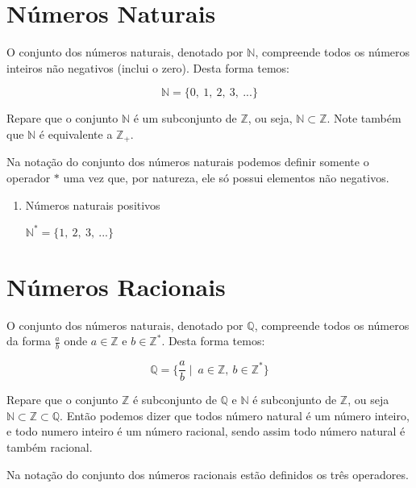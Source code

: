 \documentclass[]{book}
\begin{document}
\section{Números Naturais}\label{numeros-naturais}

O conjunto dos números naturais, denotado por \(\mathbb{N}\), compreende
todos os números inteiros não negativos (inclui o zero). Desta forma
temos:

\[\mathbb{N} = \{ 0,\ 1,\ 2,\ 3,\ ... \}\]

Repare que o conjunto \(\mathbb{N}\) é um subconjunto de \(\mathbb{Z}\),
ou seja, \(\mathbb{N} \subset \mathbb{Z}\). Note também que
\(\mathbb{N}\) é equivalente a \(\mathbb{Z}_{+}\).

Na notação do conjunto dos números naturais podemos definir somente o
operador \(*\) uma vez que, por natureza, ele só possui elementos não
negativos.

\begin{enumerate}
\def\labelenumi{\arabic{enumi}.}
\item
  Números naturais positivos

  \(\mathbb{N}^{*} = \{ 1,\ 2,\ 3,\ ... \}\)
\end{enumerate}

\section{Números Racionais}\label{numeros-racionais}

O conjunto dos números naturais, denotado por \(\mathbb{Q}\), compreende
todos os números da forma \(\frac{a}{b}\) onde \(a \in \mathbb{Z}\) e
\(b \in \mathbb{Z}^{*}\). Desta forma temos:

\[\mathbb{Q} = \{ \frac{a}{b} \mid \ a \in \mathbb{Z},\ b \in \mathbb{Z}^{*} \}\]

Repare que o conjunto \(\mathbb{Z}\) é subconjunto de \(\mathbb{Q}\) e
\(\mathbb{N}\) é subconjunto de \(\mathbb{Z}\), ou seja
\(\mathbb{N} \subset \mathbb{Z} \subset \mathbb{Q}\). Então podemos
dizer que todos número natural é um número inteiro, e todo numero
inteiro é um número racional, sendo assim todo número natural é também
racional.

Na notação do conjunto dos números racionais estão definidos os três
operadores.
\end{document}
